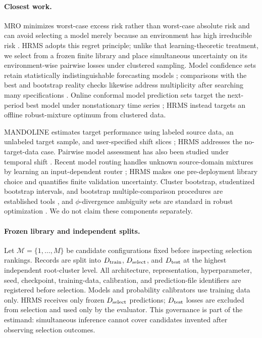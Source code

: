 \documentclass{article}
\newcommand{\M}{\mathcal{M}}
\begin{document}
\paragraph{Closest work.}
MRO minimizes worst-case excess risk rather than worst-case absolute risk and can avoid selecting a model merely because an environment has high irreducible risk \citep{agarwal2022mro}.  HRMS adopts this regret principle; unlike that learning-theoretic treatment, we select from a frozen finite library and place simultaneous uncertainty on its environment-wise pairwise losses under clustered sampling.  Model confidence sets retain statistically indistinguishable forecasting models \citep{hansen2011mcs}; comparisons with the best and bootstrap reality checks likewise address multiplicity after searching many specifications \citep{hsu1981best,white2000reality}.  Online conformal model prediction sets target the next-period best model under nonstationary time series \citep{li2026online}; HRMS instead targets an offline robust-mixture optimum from clustered data.

MANDOLINE estimates target performance using labeled source data, an unlabeled target sample, and user-specified shift slices \citep{chen2021mandoline}; HRMS addresses the no-target-data case.  Pairwise model assessment has also been studied under temporal shift \citep{han2024model}.  Recent model routing handles unknown source-domain mixtures by learning an input-dependent router \citep{dann2025routing}; HRMS makes one pre-deployment library choice and quantifies finite validation uncertainty.  Cluster bootstrap, studentized bootstrap intervals, and bootstrap multiple-comparison procedures are established tools \citep{field2007cluster,hall1988bootstrap,westfall2011bootstrap}, and $\phi$-divergence ambiguity sets are standard in robust optimization \citep{bental2013phi}.  We do not claim these components separately.

\paragraph{Frozen library and independent splits.}
Let $\M=\{1,\ldots,M\}$ be candidate configurations fixed before inspecting selection rankings.  Records are split into $D_{\rm train}$, $D_{\rm select}$, and $D_{\rm test}$ at the highest independent root-cluster level.  All architecture, representation, hyperparameter, seed, checkpoint, training-data, calibration, and prediction-file identifiers are registered before selection.  Models and probability calibrators use training data only.  HRMS receives only frozen $D_{\rm select}$ predictions; $D_{\rm test}$ losses are excluded from selection and used only by the evaluator.  This governance is part of the estimand: simultaneous inference cannot cover candidates invented after observing selection outcomes.
\end{document}
